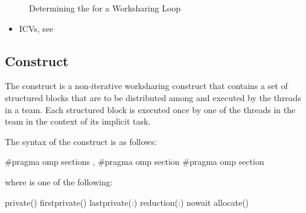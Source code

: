 
\begin{figure}[h]
\begin{quote} %

\end{quote}
\caption{Determining the  for a Worksharing Loop\label{fig:schedule loop}}
\end{figure}

\crossreferences
\begin{itemize}
\item ICVs, see
\end{itemize}











\subsection{ Construct}
\label{subsec:sections Construct}
\summary
The  construct is a non-iterative worksharing construct that contains a set of
structured blocks that are to be distributed among and executed by the threads in a team.
Each structured block is executed once by one of the threads in the team in the context
of its implicit task.

\syntax
\begin{ccppspecific}
The syntax of the  construct is as follows:

\begin{ompcPragma}
#pragma omp sections \plc{[clause[ [},\plc{] clause] ... ] new-line}
   {
   \plc{[}#pragma omp section \plc{]}
   \plc{[}#pragma omp section 
      \plc{structured-block]}
   }
\end{ompcPragma}

where  is one of the following:

\begin{indentedcodelist}
private()
firstprivate()
lastprivate(\plc{[ lastprivate-modifier}:\plc{] list})
reduction(:)
nowait
allocate(\plc{[allocator: ]})
\end{indentedcodelist}
\end{ccppspecific}


